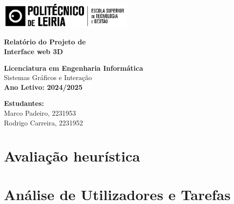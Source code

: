 \documentclass[a4paper,12pt]{article}
\begin{document}
\begin{titlepage}
\begin{center}
    \includegraphics[width=0.5\textwidth]{logo_ipl.png}
\end{center}

\vspace{1cm}

\begin{center}
    \fboxsep=10pt
    \parbox[c][3cm][c]{0.8\textwidth}{
        \centering
        \textbf{\Large Relatório do Projeto de}\\[0.3cm]
        \textbf{\Large Interface web 3D}
    }
\end{center}

\vfill

\begin{center}
    \textbf{Licenciatura em Engenharia Informática}\\
    Sistemas Gráficos e Interação\\[0.5cm]
    \vspace{1cm}
    \textbf{Ano Letivo: 2024/2025}
\end{center}

\vfill

\begin{center}
    \textbf{Estudantes:}\\[0.3cm]
    Marco Padeiro, 2231953\\
    Rodrigo Carreira, 2231952
\end{center}
\thispagestyle{plain}
\end{titlepage}

\newpage
\tableofcontents

\newpage
\section{Avaliação heurística}

\newpage
\section{Análise de Utilizadores e Tarefas}
\end{document}
